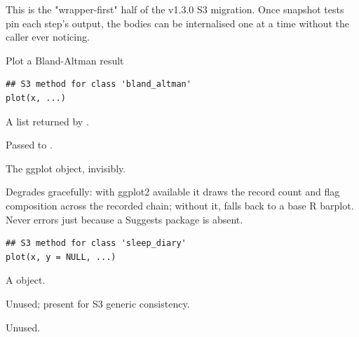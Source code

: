 \documentclass[a4paper]{book}
\begin{document}
%
\begin{Details}
This is the "wrapper-first" half of the v1.3.0 S3 migration. Once snapshot
tests pin each step's output, the bodies can be internalised one at a time
without the caller ever noticing.
\end{Details}
%
\begin{Description}
Plot a Bland-Altman result
\end{Description}
%
\begin{Usage}
\begin{verbatim}
## S3 method for class 'bland_altman'
plot(x, ...)
\end{verbatim}
\end{Usage}
%
\begin{Arguments}
\begin{ldescription}
\item[\code{x}] A list returned by .

\item[\code{...}] Passed to .
\end{ldescription}
\end{Arguments}
%
\begin{Value}
The ggplot object, invisibly.
\end{Value}
%
\begin{Description}
Degrades gracefully: with ggplot2 available it draws the record count and
flag composition across the recorded chain; without it, falls back to a base
R barplot. Never errors just because a Suggests package is absent.
\end{Description}
%
\begin{Usage}
\begin{verbatim}
## S3 method for class 'sleep_diary'
plot(x, y = NULL, ...)
\end{verbatim}
\end{Usage}
%
\begin{Arguments}
\begin{ldescription}
\item[\code{x}] A  object.

\item[\code{y}] Unused; present for S3 generic consistency.

\item[\code{...}] Unused.
\end{ldescription}
\end{Arguments}
\end{document}
